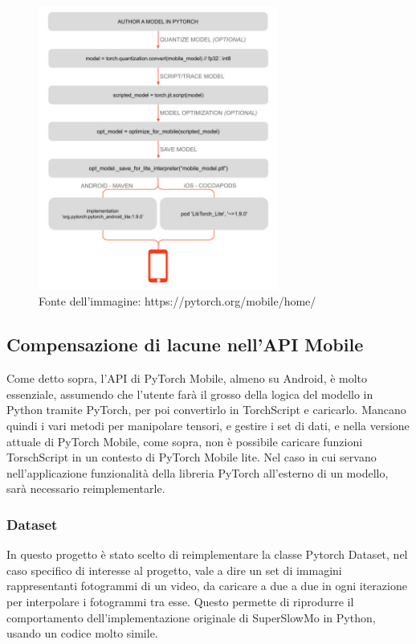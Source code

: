 \begin{figure}[!bh]
    \centering
    \includegraphics[width=0.7\textwidth]{img/pytorch_mobile_workflow.jpg}
    \caption{Fonte dell'immagine: https://pytorch.org/mobile/home/}
    \label{fig:workflow_pytorch_mobile}
\end{figure}

\FloatBarrier

\subsection{Compensazione di lacune nell'API Mobile}

Come detto sopra, l'API di PyTorch Mobile, almeno su Android, è molto essenziale, assumendo
che l'utente farà il grosso della logica del modello in Python tramite PyTorch, per poi
convertirlo in TorchScript e caricarlo. Mancano quindi i vari metodi per manipolare tensori,
e gestire i set di dati, e nella versione attuale di PyTorch Mobile, come sopra, non è possibile
caricare funzioni TorschScript in un contesto di PyTorch Mobile lite. Nel caso in cui servano 
nell'applicazione funzionalità della libreria PyTorch all'esterno di un modello, sarà necessario
reimplementarle.

\subsubsection*{Dataset}
\label{sec:dataset}

In questo progetto è stato scelto di reimplementare la classe Pytorch Dataset, 
nel caso specifico di interesse al progetto, vale a dire un set di immagini rappresentanti
fotogrammi di un video, da caricare a due a due in ogni iterazione per interpolare i fotogrammi
tra esse. Questo permette di riprodurre il comportamento dell'implementazione originale di
SuperSlowMo in Python, usando un codice molto simile.

